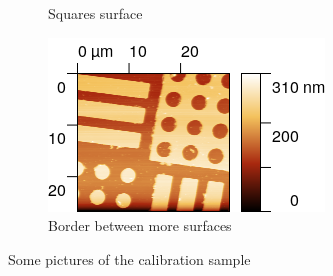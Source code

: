 \documentclass[11pt,a4paper]{article}
\begin{document}
\begin{figure}[H]
\begin{subfigure}[b]{0.45\textwidth}
\caption{Squares surface}
\label{fig:sm_squares}
\end{subfigure}
\begin{subfigure}[b]{0.45\textwidth}
\includegraphics[width=\textwidth]{sm_border}
\caption{Border between more surfaces}
\label{fig:sm_border}
\end{subfigure}
\caption{Some pictures of the calibration sample}
\end{figure}
\end{document}
